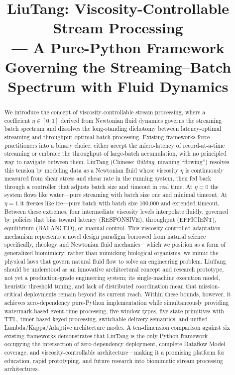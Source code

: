 \documentclass[conference]{IEEEtran}
\title{LiuTang: Viscosity-Controllable Stream Processing\\--- A Pure-Python Framework Governing the Streaming--Batch Spectrum with Fluid Dynamics}
\author{\IEEEauthorblockN{Author Name}
\IEEEauthorblockA{Affiliation\\
email@example.com}}
\begin{document}
\maketitle

\begin{abstract}
We introduce the concept of viscosity-controllable stream processing, where a coefficient $\eta \in [0,1]$ derived from Newtonian fluid dynamics governs the streaming--batch spectrum and dissolves the long-standing dichotomy between latency-optimal streaming and throughput-optimal batch processing. Existing frameworks force practitioners into a binary choice: either accept the micro-latency of record-at-a-time streaming or embrace the throughput of large-batch accumulation, with no principled way to navigate between them. LiuTang (Chinese: \emph{li\'{u}t\v{a}ng}, meaning ``flowing'') resolves this tension by modeling data as a Newtonian fluid whose viscosity $\eta$ is continuously measured from shear stress and shear rate in the running system, then fed back through a controller that adjusts batch size and timeout in real time. At $\eta = 0$ the system flows like water---pure streaming with batch size one and minimal timeout. At $\eta = 1$ it freezes like ice---pure batch with batch size 100,000 and extended timeout. Between these extremes, four intermediate viscosity levels interpolate fluidly, governed by policies that bias toward latency (RESPONSIVE), throughput (EFFICIENT), equilibrium (BALANCED), or manual control. This viscosity-controlled adaptation mechanism represents a novel design paradigm borrowed from natural science---specifically, rheology and Newtonian fluid mechanics---which we position as a form of generalized biomimicry: rather than mimicking biological organisms, we mimic the physical laws that govern natural fluid flow to solve an engineering problem. LiuTang should be understood as an innovative architectural concept and research prototype, not yet a production-grade engineering system; its single-machine execution model, heuristic threshold tuning, and lack of distributed coordination mean that mission-critical deployments remain beyond its current reach. Within these bounds, however, it achieves zero-dependency pure-Python implementation while simultaneously providing watermark-based event-time processing, five window types, five state primitives with TTL, timer-based keyed processing, switchable delivery semantics, and unified Lambda/Kappa/Adaptive architecture modes. A ten-dimension comparison against six existing frameworks demonstrates that LiuTang is the only Python framework occupying the intersection of zero-dependency deployment, complete Dataflow Model coverage, and viscosity-controllable architecture---making it a promising platform for education, rapid prototyping, and future research into biomimetic stream processing architectures.
\end{abstract}
\end{document}

